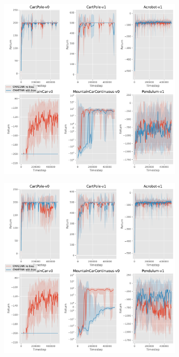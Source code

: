 \documentclass[12pt,a4paper]{article}
\begin{document}
\begin{figure}[ht!]
  \centering
  \begin{subfigure}[ht!]{0.35\textwidth}
    \includegraphics[width=\textwidth]{../plotting/plots/plot_bias_perf0.pdf}
    \caption{}
  \end{subfigure}
  \hspace{0.05\textwidth}
  \begin{subfigure}[ht!]{0.35\textwidth}
    \includegraphics[width=\textwidth]{../plotting/plots/plot_bias_perf1.pdf}
    \caption{}
  \end{subfigure}


\end{figure}
\end{document}
